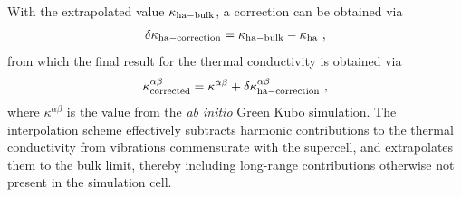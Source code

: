 With the extrapolated value $\kappa_{\rm ha-bulk}$, a correction can be obtained via
\begin{align}
	\delta \kappa_{\rm ha-correction} 
		= \kappa_{\rm ha-bulk} - \kappa_{\rm ha}~,
	\label{eq:imp.K.correction}
\end{align}
from which the final result for the thermal conductivity is obtained via
\begin{align}
	\kappa^{\alpha \beta}_{\rm corrected}
		 = \kappa^{\alpha \beta} + \delta \kappa^{\alpha \beta}_{\rm ha-correction}~,
	\label{eq:imp.K.corrected}
\end{align}
where $\kappa^{\alpha \beta}$ is the value from the \emph{ab initio} Green Kubo simulation. The interpolation scheme effectively subtracts harmonic contributions to the thermal conductivity from vibrations commensurate with the supercell, and extrapolates them to the bulk limit, thereby including long-range contributions otherwise not present in the simulation cell.

